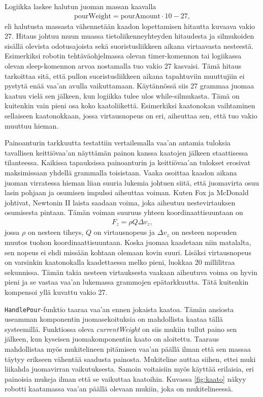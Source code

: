 Logiikka laskee halutun juoman massan kaavalla
\begin{align}
    \mathrm{pourWeight} = \mathrm{pourAmount} \cdot 10 - 27 \mathrm{,}
\end{align}
eli halutusta massasta vähennetään kaadon lopettamisen hitautta kuvaava vakio 27. Hitaus johtuu muun muassa tietoliikenneyhteyden hitaudesta ja silmukoiden sisällä olevista odotusajoista sekä suoristusliikkeen aikana virtaavasta nesteestä. Esimerkiksi robotin tehtäväohjelmassa olevan timer-komennon tai logiikassa olevan sleep-komennon arvoa nostamalla tuo vakio 27 kasvaisi. Tämä hitaus tarkoittaa sitä, että pullon suoristusliikkeen aikana tapahtuviin muuttujiin ei pystytä enää vaa'an avulla vaikuttamaan. Käytännössä siis 27 grammaa juomaa kaatuu vielä sen jälkeen, kun logiikka tulee ulos while-silmukasta. Tämä on kuitenkin vain pieni osa koko kaatoliikettä. Esimerkiksi kaatonokan vaihtaminen sellaiseen kaatonokkaan, jossa virtausnopeus on eri, aiheuttaa sen, että tuo vakio muuttuu hieman.

Painoanturin tarkkuutta testattiin vertailemalla vaa'an antamia tuloksia tavallisen keittiövaa'an näyttämän painon kanssa kaatojen jälkeen staattisessa tilanteessa. Kaikissa tapauksissa painoanturin ja keittiövaa'an tulokset erosivat maksimissaan yhdellä grammalla toisistaan. Vaaka osoittaa kaadon aikana juoman virratessa hieman liian suuria lukemia johtuen siitä, että juomavirta osuu lasin pohjaan ja osumisen impulssi aiheuttaa voiman. Kuten Fox ja McDonald \cite[s.197-198]{Fox2011} johtivat, Newtonin II laista saadaan voima, joka aiheutuu nestevirtauksen osumisesta pintaan. Tämän voiman suuruus yhteen koordinaattisuuntaan on
\begin{align}
    F_z = \rho Q \Delta v_z \mathrm{,}
\end{align}
jossa $\rho$ on nesteen tiheys, $Q$ on virtausnopeus ja $\Delta v_z$ on nesteen nopeuden muutos tuohon koordinaattisuuntaan. Koska juomaa kaadetaan niin matalalta, sen nopeus ei ehdi missään kohtaan olemaan kovin suuri. Lisäksi virtausnopeus on varsinkin kaatonokalla kaadettaessa melko pieni, luokkaa 20 millilitraa sekunnissa. Tämän takia nesteen virtauksesta vaakaan aiheutuva
voima on hyvin pieni ja se vastaa vaa'an lukemassa grammojen epätarkkuutta. Tätä kuitenkin kompensoi yllä kuvattu vakio 27.

\texttt{HandlePour}-funktio taaraa vaa'an ennen jokaista kaatoa. Tämän ansiosta useamman komponentin juomasekoituksia on mahdollista kaataa tällä systeemillä. Funktiossa oleva \textit{currentWeight} on siis mukiin tullut paino sen jälkeen, kun kyseisen juomakomponentin kaato on aloitettu. Taaraus mahdollistaa myös mukitelineen pitämisen vaa'an päällä ilman että sen massaa täytyy erikseen vähentää saadusta painosta. Mukiteline auttaa siihen, ettei muki liikahda juomavirran vaikutuksesta. Samoin voitaisiin myös käyttää erilaisia, eri painoisia mukeja ilman että se vaikuttaa kaatoihin. Kuvassa \ref{fig:kaato} näkyy robotti kaatamassa vaa'an päällä olevaan mukiin, joka on mukitelineessä.

